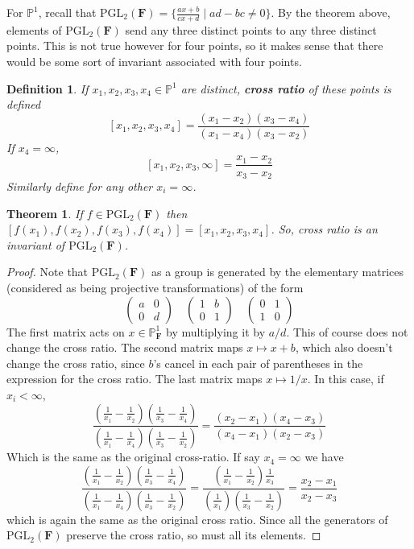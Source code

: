 \documentclass[12pt]{article}
\newcommand{\F}{\mathbf{F}}
\renewcommand{\P}{\mathbb{P}}
\newcommand{\PGL}{\mathrm{PGL}}
\newtheorem{definition}{Definition}[section]
\newtheorem{theorem}{Theorem}[section]
\begin{document}
    For $\P^1$, recall that $\PGL_2(\F) = \{\frac{ax+b}{cx+d} \mid ad - bc \neq 0\}$. By the theorem above, elements of $\PGL_2(\F)$ send any three distinct points to any three distinct points. This is not true however for four points, so it makes sense that there would be some sort of invariant associated with four points. 
    \begin{definition}
        If $x_1, x_2, x_3, x_4 \in \P^1$ are distinct, \textbf{cross ratio} of these points is defined 
        $$[x_1, x_2, x_3, x_4] = \frac{(x_1-x_2)(x_3-x_4)}{(x_1-x_4)(x_3-x_2)}$$
        If $x_4 = \infty$, 
        $$[x_1, x_2, x_3, \infty] = \frac{x_1 - x_2}{x_3 - x_2}$$
        Similarly define for any other $x_i = \infty$. 
    \end{definition}
    \begin{theorem}
        If $f \in \PGL_2(\F)$ then $[f(x_1), f(x_2), f(x_3), f(x_4)] = [x_1, x_2, x_3, x_4]$. So, cross ratio is an invariant of $\PGL_2(\F)$.
    \end{theorem}
    \begin{proof}
        Note that $\PGL_2(\F)$ as a group is generated by the elementary matrices (considered as being projective transformations) of the form 
        $$\begin{pmatrix}
            a & 0 \\
            0 & d 
        \end{pmatrix} \quad 
        \begin{pmatrix}
            1 & b \\
            0 & 1
        \end{pmatrix} \quad 
        \begin{pmatrix}
            0 & 1 \\
            1 & 0
        \end{pmatrix}$$
        The first matrix acts on $x \in \P_\F^1$ by multiplying it by $a/d$. This of course does not change the cross ratio. The second matrix maps $x \mapsto x + b$, which also doesn't change the cross ratio, since $b$'s cancel in each pair of parentheses in the expression for the cross ratio. The last matrix maps $x \mapsto 1/x$. In this case, if $x_i < \infty$, 
        $$\frac{\left(\frac{1}{x_1} - \frac{1}{x_2}\right)\left(\frac{1}{x_3} - \frac{1}{x_4}\right)}{\left(\frac{1}{x_1} - \frac{1}{x_4}\right)\left(\frac{1}{x_3} - \frac{1}{x_2}\right)} = \frac{(x_2 - x_1)(x_4 - x_3)}{(x_4-x_1)(x_2-x_3)}$$
        Which is the same as the original cross-ratio. If say $x_4 = \infty$ we have 
        $$\frac{\left(\frac{1}{x_1} - \frac{1}{x_2}\right)\left(\frac{1}{x_3} - \frac{1}{x_4}\right)}{\left(\frac{1}{x_1} - \frac{1}{x_4}\right)\left(\frac{1}{x_3} - \frac{1}{x_2}\right)} = \frac{\left(\frac{1}{x_1} - \frac{1}{x_2}\right)\frac{1}{x_3}}{\left(\frac{1}{x_1}\right)\left(\frac{1}{x_3} - \frac{1}{x_2}\right)} = \frac{x_2 - x_1}{x_2 - x_3}$$
        which is again the same as the original cross ratio. Since all the generators of $\PGL_2(\F)$ preserve the cross ratio, so must all its elements. 
    \end{proof}
\end{document}
